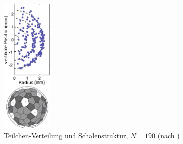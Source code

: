 \documentclass[numbers=noenddot,a4paper,notitlepage,twoside,BCOR15mm]{scrbook}
\begin{document}
						\begin{figure}
							\centering
							\includegraphics[width=0.22\textwidth,height=0.55\textwidth]{figs/yukawaballN190.png}
							\caption{Teilchen-Verteilung und Schalenstruktur, $N=190$ (nach \cite{Arp04})}\label{img:strukturN190}
							\vspace{-0.5cm}
						\end{figure}
\end{document}
